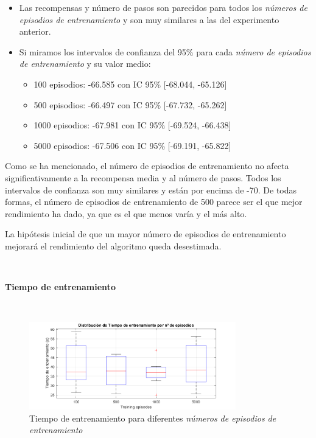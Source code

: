 \begin{itemize}
    \item Las recompensas y número de pasos son parecidos para todos los \textit{números de episodios de entrenamiento} y son muy similares a las del experimento anterior.
    \item Si miramos los intervalos de confianza del 95\% para cada \textit{número de episodios de entrenamiento} y su valor medio:
    \begin{itemize}
        \item 100 episodios: -66.585 con IC 95\% [-68.044, -65.126]
        \item 500 episodios: -66.497 con IC 95\% [-67.732, -65.262]
        \item 1000 episodios: -67.981 con IC 95\% [-69.524, -66.438]
        \item 5000 episodios: -67.506 con IC 95\% [-69.191, -65.822]
    \end{itemize}
\end{itemize}

Como se ha mencionado, el número de episodios de entrenamiento no afecta significativamente a la recompensa media y al número de pasos. Todos los intervalos de confianza son muy similares y están por encima de -70. De todas formas, el número de episodios de entrenamiento de 500 parece ser el que mejor rendimiento ha dado, ya que es el que menos varía y el más alto.

La hipótesis inicial de que un mayor número de episodios de entrenamiento mejorará el rendimiento del algoritmo queda desestimada.

\

\textbf{Tiempo de entrenamiento}

\ 

\begin{figure}[H]
    \centering
    \includegraphics[width=0.8\textwidth]{../../experiments/directEstimation/experiment-2/results/time.png}
    \caption{Tiempo de entrenamiento para diferentes \textit{números de episodios de entrenamiento}}
    \label{fig:directEstimation2-time}
\end{figure}


